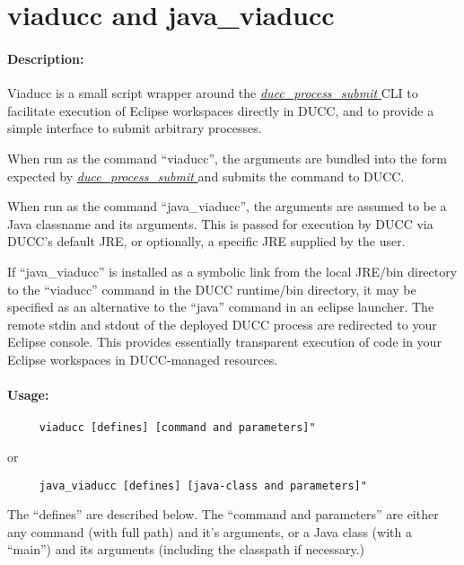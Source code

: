 \ifpdf
\else
{}
\fi
    \section{viaducc and java\_viaducc}
    \label{sec:cli.viaducc}

    \paragraph{Description:}
        Viaducc is a small script wrapper around the \hyperref[sec:cli.ducc-process-submit]{\em
          ducc\_process\_submit } CLI to facilitate execution of Eclipse workspaces directly in DUCC,
        and to provide a simple interface to submit arbitrary processes.

        When run as the command ``viaducc'', the arguments are bundled into the form expected by
        \hyperref[sec:cli.ducc-process-submit]{\em ducc\_process\_submit } and submits the command
        to DUCC.

        When run as the command ``java\_viaducc'', the arguments are assumed to be a Java classname
        and its arguments.  This is passed for execution by DUCC via DUCC's default JRE, or
        optionally, a specific JRE supplied by the user.

        If ``java\_viaducc'' is installed as a symbolic link from the local JRE/bin directory to the
        ``viaducc'' command in the DUCC runtime/bin directory, it may be specified as an alternative
        to the ``java'' command in an eclipse launcher.  The remote stdin and stdout of the deployed
        DUCC process are redirected to your Eclipse console.  This provides essentially transparent
        execution of code in your Eclipse workspaces in DUCC-managed resources.

    \paragraph{Usage:}
\begin{verbatim}
     viaducc [defines] [command and parameters]"
\end{verbatim}
     or
\begin{verbatim}
     java_viaducc [defines] [java-class and parameters]"
\end{verbatim}

     The ``defines'' are described below.  The ``command and parameters'' are either any command
     (with full path) and it's arguments, or a Java class (with a ``main'') and its arguments (including
     the classpath if necessary.)

